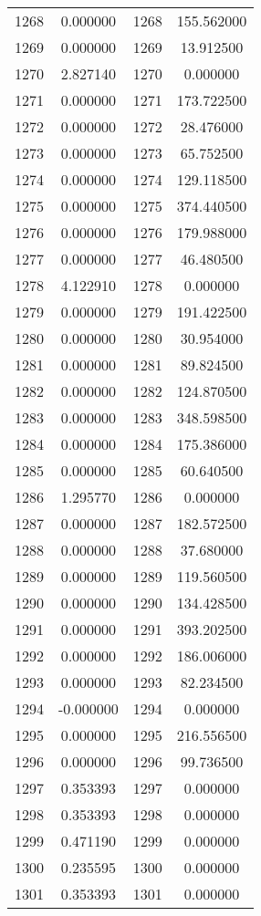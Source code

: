 \documentclass[12pt]{article}
\begin{document}
\begin{longtable}{@{}cccc@{}}
1268 & 0.000000 & 1268 & 155.562000 \\
1269 & 0.000000 & 1269 & 13.912500 \\
1270 & 2.827140 & 1270 & 0.000000 \\
1271 & 0.000000 & 1271 & 173.722500 \\
1272 & 0.000000 & 1272 & 28.476000 \\
1273 & 0.000000 & 1273 & 65.752500 \\
1274 & 0.000000 & 1274 & 129.118500 \\
1275 & 0.000000 & 1275 & 374.440500 \\
1276 & 0.000000 & 1276 & 179.988000 \\
1277 & 0.000000 & 1277 & 46.480500 \\
1278 & 4.122910 & 1278 & 0.000000 \\
1279 & 0.000000 & 1279 & 191.422500 \\
1280 & 0.000000 & 1280 & 30.954000 \\
1281 & 0.000000 & 1281 & 89.824500 \\
1282 & 0.000000 & 1282 & 124.870500 \\
1283 & 0.000000 & 1283 & 348.598500 \\
1284 & 0.000000 & 1284 & 175.386000 \\
1285 & 0.000000 & 1285 & 60.640500 \\
1286 & 1.295770 & 1286 & 0.000000 \\
1287 & 0.000000 & 1287 & 182.572500 \\
1288 & 0.000000 & 1288 & 37.680000 \\
1289 & 0.000000 & 1289 & 119.560500 \\
1290 & 0.000000 & 1290 & 134.428500 \\
1291 & 0.000000 & 1291 & 393.202500 \\
1292 & 0.000000 & 1292 & 186.006000 \\
1293 & 0.000000 & 1293 & 82.234500 \\
1294 & -0.000000 & 1294 & 0.000000 \\
1295 & 0.000000 & 1295 & 216.556500 \\
1296 & 0.000000 & 1296 & 99.736500 \\
1297 & 0.353393 & 1297 & 0.000000 \\
1298 & 0.353393 & 1298 & 0.000000 \\
1299 & 0.471190 & 1299 & 0.000000 \\
1300 & 0.235595 & 1300 & 0.000000 \\
1301 & 0.353393 & 1301 & 0.000000 \\

\end{longtable}
\end{document}
